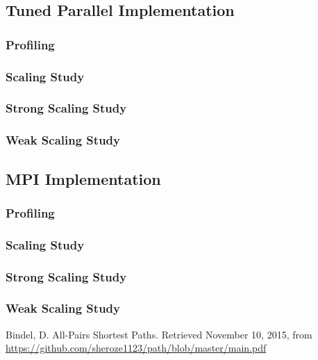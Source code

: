 \documentclass[11pt]{article}
\begin{document}
\subsection{Tuned Parallel Implementation}
\subsubsection{Profiling} \label{sec:prof}
\subsubsection{Scaling Study} \label{sec:speedup}
\subsubsection{Strong Scaling Study}
\subsubsection{Weak Scaling Study}

\subsection{MPI Implementation}
\subsubsection{Profiling} \label{sec:prof}
\subsubsection{Scaling Study} \label{sec:speedup}
\subsubsection{Strong Scaling Study}
\subsubsection{Weak Scaling Study}


\begin{thebibliography}{9}
Bindel, D. All-Pairs Shortest Paths. Retrieved November 10, 2015, from \url{https://github.com/sheroze1123/path/blob/master/main.pdf}

\end{thebibliography}

 
 
\end{document}
